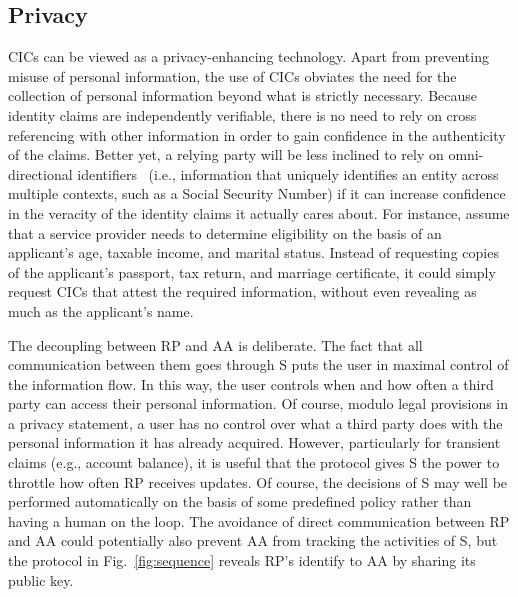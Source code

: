 \documentclass[conference]{IEEEtran}
\begin{document}


\subsection{Privacy}
CICs can be viewed as a privacy-enhancing technology. Apart from preventing misuse of personal information, the use of CICs obviates the need for the collection of personal information beyond what is strictly necessary. Because identity claims are independently verifiable, there is no need to rely on cross referencing with other information in order to gain confidence in the authenticity of the claims. Better yet, a relying party will be less inclined to rely on omni-directional identifiers~\cite{cameron2005laws} (i.e., information that uniquely identifies an entity across multiple contexts, such as a Social Security Number) if it can increase confidence in the veracity of the identity claims it actually cares about. For instance, assume that a service provider needs to determine eligibility on the basis of an applicant's age, taxable income, and marital status. Instead of requesting copies of the applicant's passport, tax return, and marriage certificate, it could simply request CICs that attest the required information, without even revealing as much as the applicant's name.

The decoupling between {\sf RP} and {\sf AA} is deliberate. The fact that all communication between them goes through {\sf S} puts the user in maximal control of the information flow. In this way, the user controls when and how often a third party can access their personal information. Of course, modulo legal provisions in a privacy statement, a user has no control over what a third party does with the personal information it has already acquired. However, particularly for transient claims (e.g., account balance), it is useful that the protocol gives {\sf S} the power to throttle how often {\sf RP} receives updates. Of course, the decisions of {\sf S} may well be performed automatically on the basis of some predefined policy rather than having a human on the loop. The avoidance of direct communication between {\sf RP} and {\sf AA} could potentially also prevent {\sf AA} from tracking the activities of {\sf S}, but the protocol in Fig.~\ref{fig:sequence} reveals {\sf RP}'s identify to {\sf AA} by sharing its public key.
\end{document}
